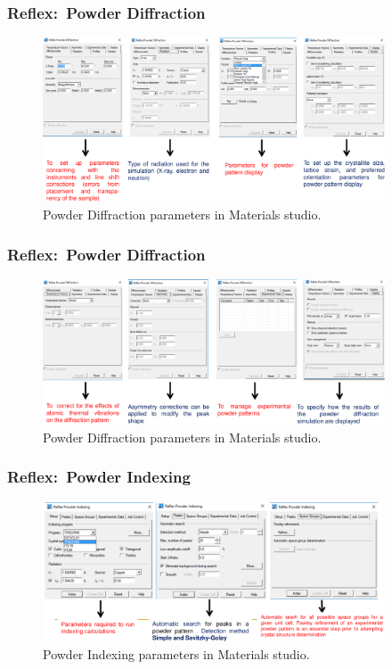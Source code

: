 \frame
{
	\frametitle{\textrm{Reflex:~Powder Diffraction}}
\begin{figure}[h!]
\centering
\vspace*{-0.10in}
\includegraphics[height=1.92in,width=4.00in,viewport=0 0 1343 644,clip]{Figures/MS-Analysis_Reflex_Powder-Diffraction-1.png}
\caption{\tiny \textrm{Powder Diffraction parameters in Materials studio.}}%
\label{Reflex-Powder_Diffraction-1}
\end{figure}
}

\frame
{
	\frametitle{\textrm{Reflex:~Powder Diffraction}}
\begin{figure}[h!]
\centering
\vspace*{-0.10in}
\includegraphics[height=1.70in,width=4.00in,viewport=0 0 1342 569,clip]{Figures/MS-Analysis_Reflex_Powder-Diffraction-2.png}
\caption{\tiny \textrm{Powder Diffraction parameters in Materials studio.}}%
\label{Reflex-Powder_Diffraction-2}
\end{figure}
}

\frame
{
	\frametitle{\textrm{Reflex:~Powder Indexing}}
\begin{figure}[h!]
\centering
\vspace*{-0.10in}
\includegraphics[height=1.63in,width=4.00in,viewport=0 0 1349 548,clip]{Figures/MS-Analysis_Reflex_Powder-Indexing.png}
\caption{\tiny \textrm{Powder Indexing parameters in Materials studio.}}%
\label{Reflex-Powder-Indexing}
\end{figure}
}

